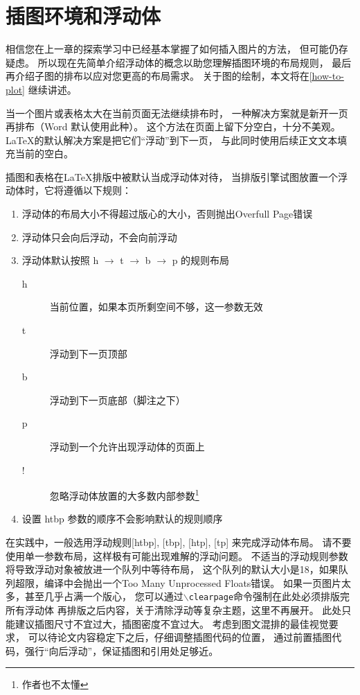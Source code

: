\section{插图环境和浮动体}

相信您在上一章的探索学习中已经基本掌握了如何插入图片的方法，
但可能仍存疑虑。
所以现在先简单介绍浮动体的概念以助您理解插图环境的布局规则，
最后再介绍子图的排布以应对您更高的布局需求。
关于图的绘制，本文将在\ref{how-to-plot} 继续讲述。

当一个图片或表格太大在当前页面无法继续排布时，
一种解决方案就是新开一页再排布（Word 默认使用此种）。
这个方法在页面上留下分空白，十分不美观。
\LaTeX 的默认解决方案是把它们“浮动”到下一页，
与此同时使用后续正文文本填充当前的空白。

插图和表格在\LaTeX 排版中被默认当成浮动体对待，
当排版引擎试图放置一个浮动体时，它将遵循以下规则：
\begin{enumerate}
    \item 浮动体的布局大小不得超过版心的大小，否则抛出Overfull Page错误
    \item 浮动体只会向后浮动，不会向前浮动
    \item 浮动体默认按照 h $\to$ t $\to$ b $\to$ p 的规则布局
    \begin{description}
        \item[h] 当前位置，如果本页所剩空间不够，这一参数无效
        \item[t] 浮动到下一页顶部
        \item[b] 浮动到下一页底部（脚注之下）
        \item[p] 浮动到一个允许出现浮动体的页面上
        \item[!] 忽略浮动体放置的大多数内部参数\footnote{作者也不太懂}
    \end{description}
    \item 设置 htbp 参数的顺序不会影响默认的规则顺序
\end{enumerate}

在实践中，一般选用浮动规则[htbp], [tbp], [htp], [tp] 来完成浮动体布局。
请不要使用单一参数布局，这样极有可能出现难解的浮动问题。
不适当的浮动规则参数将导致浮动对象被放进一个队列中等待布局，
这个队列的默认大小是18，如果队列超限，编译中会抛出一个Too Many Unprocessed Floats错误。
如果一页图片太多，甚至几乎占满一个版心，
您可以通过\texttt{$\backslash$clearpage}命令强制在此处必须排版完所有浮动体
再排版之后内容，关于清除浮动等复杂主题，这里不再展开。
此处只能建议插图尺寸不宜过大，插图密度不宜过大。
考虑到图文混排的最佳视觉要求，
可以待论文内容稳定下之后，仔细调整插图代码的位置，
通过前置插图代码，强行“向后浮动”，保证插图和引用处足够近。

